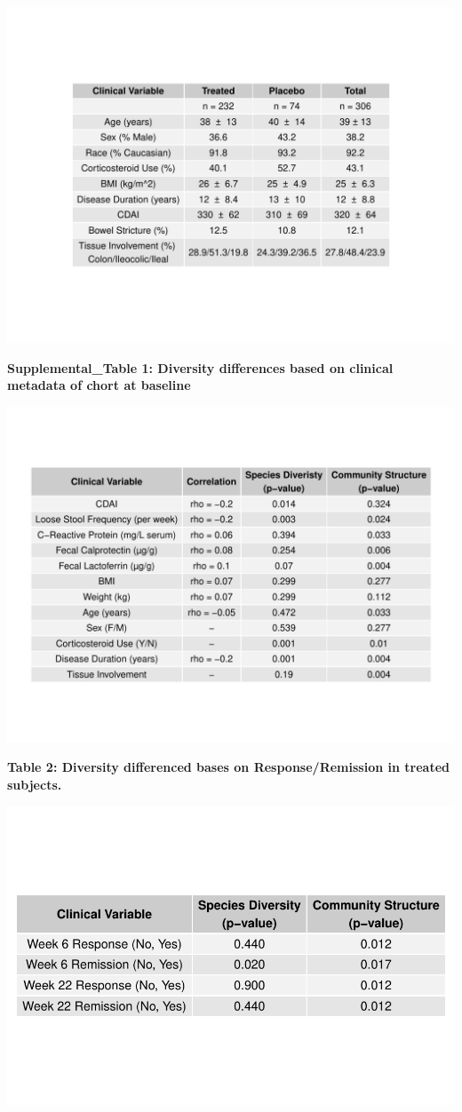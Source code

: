 \documentclass[11pt,]{article}
\begin{document}
\includegraphics{tables/SupTable1_baseline_metadata.pdf}

\newpage

\textbf{Supplemental\_Table 1: Diversity differences based on clinical
metadata of chort at baseline}

\includegraphics{tables/table1_cohortdiversity.pdf}

\newpage

\textbf{Table 2: Diversity differenced bases on Response/Remission in
treated subjects.}

\includegraphics{tables/table2diversity.pdf}
\end{document}
